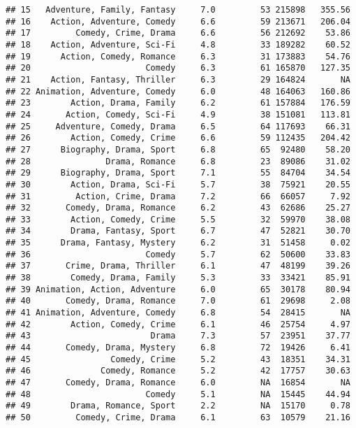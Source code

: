 \documentclass[
]{article}
\begin{document}
\begin{verbatim}
## 15   Adventure, Family, Fantasy     7.0         53 215898   355.56
## 16    Action, Adventure, Comedy     6.6         59 213671   206.04
## 17         Comedy, Crime, Drama     6.6         56 212692    53.86
## 18    Action, Adventure, Sci-Fi     4.8         33 189282    60.52
## 19      Action, Comedy, Romance     6.3         31 173883    54.76
## 20                       Comedy     6.3         61 165870   127.35
## 21    Action, Fantasy, Thriller     6.3         29 164824       NA
## 22 Animation, Adventure, Comedy     6.0         48 164063   160.86
## 23        Action, Drama, Family     6.2         61 157884   176.59
## 24       Action, Comedy, Sci-Fi     4.9         38 151081   113.81
## 25     Adventure, Comedy, Drama     6.5         64 117693    66.31
## 26        Action, Comedy, Crime     6.6         59 112435   204.42
## 27      Biography, Drama, Sport     6.8         65  92480    58.20
## 28               Drama, Romance     6.8         23  89086    31.02
## 29      Biography, Drama, Sport     7.1         55  84704    34.54
## 30        Action, Drama, Sci-Fi     5.7         38  75921    20.55
## 31         Action, Crime, Drama     7.2         66  66057     7.92
## 32       Comedy, Drama, Romance     6.2         43  62686    25.27
## 33        Action, Comedy, Crime     5.5         32  59970    38.08
## 34        Drama, Fantasy, Sport     6.7         47  52821    30.70
## 35      Drama, Fantasy, Mystery     6.2         31  51458     0.02
## 36                       Comedy     5.7         62  50600    33.83
## 37       Crime, Drama, Thriller     6.1         47  48199    39.26
## 38        Comedy, Drama, Family     5.3         33  33421    85.91
## 39 Animation, Action, Adventure     6.0         65  30178    80.94
## 40       Comedy, Drama, Romance     7.0         61  29698     2.08
## 41 Animation, Adventure, Comedy     6.8         54  28415       NA
## 42        Action, Comedy, Crime     6.1         46  25754     4.97
## 43                        Drama     7.3         57  23951    37.77
## 44       Comedy, Drama, Mystery     6.8         72  19426     6.41
## 45                Comedy, Crime     5.2         43  18351    34.31
## 46              Comedy, Romance     5.2         42  17757    30.63
## 47       Comedy, Drama, Romance     6.0         NA  16854       NA
## 48                       Comedy     5.1         NA  15445    44.94
## 49        Drama, Romance, Sport     2.2         NA  15170     0.78
## 50         Comedy, Crime, Drama     6.1         63  10579    21.16
\end{verbatim}
\end{document}
